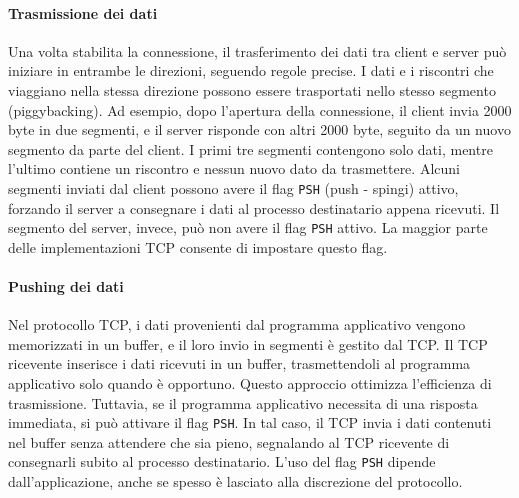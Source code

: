\documentclass[12pt]{report}
\begin{document}
	\paragraph{Trasmissione dei dati}
	Una volta stabilita la connessione, il trasferimento dei dati tra client e server può iniziare in entrambe le direzioni, seguendo regole precise. I dati e i riscontri che viaggiano nella stessa direzione possono essere trasportati nello stesso segmento (piggybacking). Ad esempio, dopo l’apertura della connessione, il client invia 2000 byte in due segmenti, e il server risponde con altri 2000 byte, seguito da un nuovo segmento da parte del client. I primi tre segmenti contengono solo dati, mentre l’ultimo contiene un riscontro e nessun nuovo dato da trasmettere.
	Alcuni segmenti inviati dal client possono avere il flag \texttt{PSH} (push - spingi) attivo, forzando il server a consegnare i dati al processo destinatario appena ricevuti. Il segmento del server, invece, può non avere il flag \texttt{PSH} attivo. La maggior parte delle implementazioni TCP consente di impostare questo flag.

	\paragraph{Pushing dei dati}
	Nel protocollo TCP, i dati provenienti dal programma applicativo vengono memorizzati in un buffer, e il loro invio in segmenti è gestito dal TCP. Il TCP ricevente inserisce i dati ricevuti in un buffer, trasmettendoli al programma applicativo solo quando è opportuno. Questo approccio ottimizza l’efficienza di trasmissione.
	Tuttavia, se il programma applicativo necessita di una risposta immediata, si può attivare il flag \texttt{PSH}. In tal caso, il TCP invia i dati contenuti nel buffer senza attendere che sia pieno, segnalando al TCP ricevente di consegnarli subito al processo destinatario. L’uso del flag \texttt{PSH} dipende dall’applicazione, anche se spesso è lasciato alla discrezione del protocollo.
\end{document}
